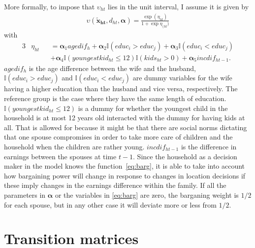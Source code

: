More formally, to impose that $\upsilon_{ht}$ lies in the unit interval, I assume it is given by 
\begin{align}
\upsilon(\boldsymbol{\tilde{x}_{ht}},d_{ht},\boldsymbol{\alpha})= \frac{\exp{(\eta_{ht})}}{1+\exp{\eta_{(ht})}}
\label{eq:barg}
\end{align}
with
\begin{alignat*}{3}
&\eta_{ht}&&=\boldsymbol{\alpha}_1 agedif_h + \boldsymbol{\alpha}_2\mathbb{I}{(educ_i > educ_j)}+\boldsymbol{\alpha}_3\mathbb{I}{(educ_i < educ_j)} \\
& &&+ \boldsymbol{\alpha}_4 \mathbb{I}{(youngestkid_{ht}\leq 12)}\mathbb{I}{(kids_{ht}>0)} + \boldsymbol{\alpha}_5 incdif_{ht-1}.
\end{alignat*}
$agedif_h$ is the age difference between the wife and the husband, $\mathbb{I}{(educ_i > educ_j)}$ and $ \mathbb{I}{(educ_i < educ_j)}$
are dummy variables for the wife having a higher education than the husband and vice versa, respectively. The reference group is the case where they have the same length of education. $\mathbb{I}{(youngestkid_{ht} \leq 12)}$ is a dummy for whether the youngest child in the household is at most 12 years old interacted with the dummy for having kids at all. That is allowed for because it might be that there are social norms dictating that one spouse compromises in order to take more care of children and the household when the children are rather young. $incdif_{ht-1}$ is the difference in earnings between the spouses at time $t-1$. Since the household as a decision maker in the model knows the function~\ref{eq:barg}, it is able to take into account how bargaining power will change in response to changes in location decisions if these imply changes in the earnings difference within the family. 
If all the parameters in $\boldsymbol{\alpha}$ or the variables in \eqref{eq:barg} are zero, the barganing weight is $1/2$ for each spouse, but in any other case it will deviate more or less from $1/2$.

\section{Transition matrices}
